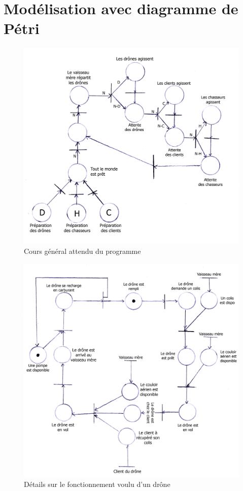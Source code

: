\section{Modélisation avec diagramme de Pétri}

\begin{figure}[H]
    \centering
    \includegraphics[width=.67\linewidth]{./figures/PTREE2.png}
    \caption{Cours général attendu du programme}
\end{figure}
\begin{figure}[H]
    \centering
    \includegraphics[width=.67\linewidth]{./figures/PTREE1.png}
    \caption{Détails sur le fonctionnement  voulu d'un drône}
\end{figure}
